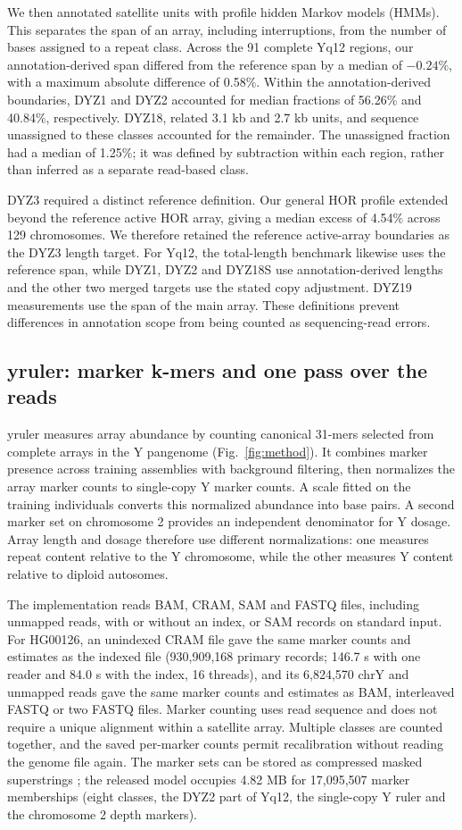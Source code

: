 \documentclass[pdflatex,sn-nature]{sn-jnl}
\begin{document}
We then annotated satellite units with profile hidden Markov models (HMMs). This separates the span of an array, including interruptions, from the number of bases assigned to a repeat class. Across the 91 complete Yq12 regions, our annotation-derived span differed from the reference span by a median of $-0.24\%$, with a maximum absolute difference of 0.58\%. Within the annotation-derived boundaries, DYZ1 and DYZ2 accounted for median fractions of 56.26\% and 40.84\%, respectively. DYZ18, related 3.1 kb and 2.7 kb units, and sequence unassigned to these classes accounted for the remainder. The unassigned fraction had a median of 1.25\%; it was defined by subtraction within each region, rather than inferred as a separate read-based class.

DYZ3 required a distinct reference definition. Our general HOR profile extended beyond the reference active HOR array, giving a median excess of 4.54\% across 129 chromosomes. We therefore retained the reference active-array boundaries as the DYZ3 length target. For Yq12, the total-length benchmark likewise uses the reference span, while DYZ1, DYZ2 and DYZ18S use annotation-derived lengths and the other two merged targets use the stated copy adjustment. DYZ19 measurements use the span of the main array. These definitions prevent differences in annotation scope from being counted as sequencing-read errors.

\subsection{yruler: marker k-mers and one pass over the reads}\label{sec:res-yruler}
yruler measures array abundance by counting canonical 31-mers selected from complete arrays in the Y pangenome (Fig.~\ref{fig:method}). It combines marker presence across training assemblies with background filtering, then normalizes the array marker counts to single-copy Y marker counts. A scale fitted on the training individuals converts this normalized abundance into base pairs. A second marker set on chromosome 2 provides an independent denominator for Y dosage. Array length and dosage therefore use different normalizations: one measures repeat content relative to the Y chromosome, while the other measures Y content relative to diploid autosomes.

The implementation reads BAM, CRAM, SAM and FASTQ files, including unmapped reads, with or without an index, or SAM records on standard input. For HG00126, an unindexed CRAM file gave the same marker counts and estimates as the indexed file (930,909,168 primary records; 146.7 s with one reader and 84.0 s with the index, 16 threads), and its 6,824,570 chrY and unmapped reads gave the same marker counts and estimates as BAM, interleaved FASTQ or two FASTQ files. Marker counting uses read sequence and does not require a unique alignment within a satellite array. Multiple classes are counted together, and the saved per-marker counts permit recalibration without reading the genome file again. The marker sets can be stored as compressed masked superstrings \cite{Sladky2023}; the released model occupies 4.82 MB for 17,095,507 marker memberships (eight classes, the DYZ2 part of Yq12, the single-copy Y ruler and the chromosome 2 depth markers).
\end{document}
